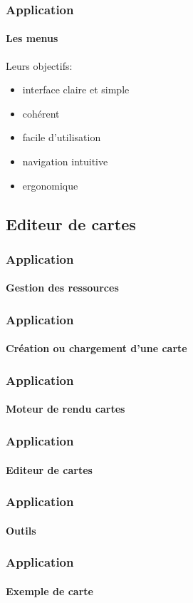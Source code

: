 	\begin{frame}
	\frametitle{Application}
	\framesubtitle{Les menus}
	
		\begin{block}{Leurs objectifs:}
			\begin{itemize}
			  \item interface claire et simple
			  \item cohérent
			  \item facile d'utilisation
			  \item navigation intuitive
			  \item ergonomique
			\end{itemize}
		\end{block}
	\end{frame}
	
\subsection{Editeur de cartes}

	\begin{frame}
	\frametitle{Application}
	\framesubtitle{Gestion des ressources}
	
	
	\end{frame}

	\begin{frame}
	\frametitle{Application}
	\framesubtitle{Création ou chargement d'une carte}
	
	\end{frame}
	
	\begin{frame}
	\frametitle{Application}
	\framesubtitle{Moteur de rendu cartes}
	
	\end{frame}
	
	
	\begin{frame}
	\frametitle{Application}
	\framesubtitle{Editeur de cartes}
	
	\end{frame}
	
	\begin{frame}
	\frametitle{Application}
	\framesubtitle{Outils}
	
	\end{frame}
	
	\begin{frame}
	\frametitle{Application}
	\framesubtitle{Exemple de carte}
	
	\end{frame}
	
